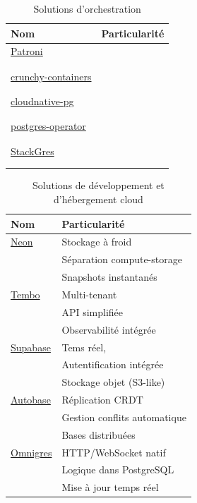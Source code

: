\documentclass[a4paper,12pt]{article}
\begin{document}
\begin{multicols*}{2}
\begin{table}[H]
\caption{Solutions d'orchestration}
\centering
\begin{tabular}{ll}
Nom & Particularité\\
\hline
\href{https://github.com/patroni/patroni}{Patroni} & \\
 & \\
 & \\
\href{https://github.com/CrunchyData/crunchy-containers}{crunchy-containers} & \\
 & \\
 & \\
\href{https://github.com/cloudnative-pg/cloudnative-pg}{cloudnative-pg} & \\
 & \\
 & \\
\href{https://github.com/CrunchyData/postgres-operator}{postgres-operator} & \\
 & \\
 & \\
\href{https://gitlab.com/ongresinc/stackgres}{StackGres} & \\
 & \\
 & \\
\end{tabular}
\end{table}

\begin{table}[H]
\caption{Solutions de développement et d'hébergement cloud}
\centering
\begin{tabular}{ll}
Nom & Particularité\\
\hline
\href{https://github.com/neondatabase/neon}{Neon} & Stockage à froid\\
 & Séparation compute-storage\\
 & Snapshots instantanés\\
\href{https://github.com/tembo-io/tembo}{Tembo} & Multi-tenant\\
 & API simplifiée\\
 & Observabilité intégrée\\
\href{https://github.com/supabase/supabase}{Supabase} & Tems réel,\\
 & Autentification intégrée\\
 & Stockage objet (S3-like)\\
\href{https://github.com/vitabaks/autobase?tab=readme-ov-file}{Autobase} & Réplication CRDT\\
 & Gestion conflits automatique\\
 & Bases distribuées\\
\href{https://github.com/omnigres/omnigres}{Omnigres} & HTTP/WebSocket natif\\
 & Logique dans PostgreSQL\\
 & Mise à jour temps réel\\
\end{tabular}
\end{table}


\end{multicols*}
\end{document}
